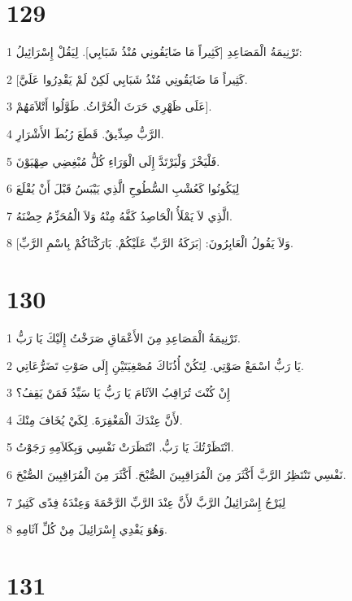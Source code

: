 \chapter{129}

\par 1 تَرْنِيمَةُ الْمَصَاعِدِ [كَثِيراً مَا ضَايَقُونِي مُنْذُ شَبَابِي]. لِيَقُلْ إِسْرَائِيلُ:
\par 2 [كَثِيراً مَا ضَايَقُونِي مُنْذُ شَبَابِي لَكِنْ لَمْ يَقْدِرُوا عَلَيَّ.
\par 3 عَلَى ظَهْرِي حَرَثَ الْحُرَّاثُ. طَوَّلُوا أَتْلاَمَهُمْ].
\par 4 الرَّبُّ صِدِّيقٌ. قَطَعَ رُبُطَ الأَشْرَارِ.
\par 5 فَلْيَخْزَ وَلْيَرْتَدَّ إِلَى الْوَرَاءِ كُلُّ مُبْغِضِي صِهْيَوْنَ.
\par 6 لِيَكُونُوا كَعُشْبِ السُّطُوحِ الَّذِي يَيْبَسُ قَبْلَ أَنْ يُقْلَعَ
\par 7 الَّذِي لاَ يَمْلَأُ الْحَاصِدُ كَفَّهُ مِنْهُ وَلاَ الْمُحَزِّمُ حِضْنَهُ.
\par 8 وَلاَ يَقُولُ الْعَابِرُونَ: [بَرَكَةُ الرَّبِّ عَلَيْكُمْ. بَارَكْنَاكُمْ بِاسْمِ الرَّبِّ].

\chapter{130}

\par 1 تَرْنِيمَةُ الْمَصَاعِدِ مِنَ الأَعْمَاقِ صَرَخْتُ إِلَيْكَ يَا رَبُّ.
\par 2 يَا رَبُّ اسْمَعْ صَوْتِي. لِتَكُنْ أُذُنَاكَ مُصْغِيَتَيْنِ إِلَى صَوْتِ تَضَرُّعَاتِي.
\par 3 إِنْ كُنْتَ تُرَاقِبُ الآثَامَ يَا رَبُّ يَا سَيِّدُ فَمَنْ يَقِفُ؟
\par 4 لأَنَّ عِنْدَكَ الْمَغْفِرَةَ. لِكَيْ يُخَافَ مِنْكَ.
\par 5 انْتَظَرْتُكَ يَا رَبُّ. انْتَظَرَتْ نَفْسِي وَبِكَلاَمِهِ رَجَوْتُ.
\par 6 نَفْسِي تَنْتَظِرُ الرَّبَّ أَكْثَرَ مِنَ الْمُرَاقِبِينَ الصُّبْحَ. أَكْثَرَ مِنَ الْمُرَاقِبِينَ الصُّبْحَ.
\par 7 لِيَرْجُ إِسْرَائِيلُ الرَّبَّ لأَنَّ عِنْدَ الرَّبِّ الرَّحْمَةَ وَعِنْدَهُ فِدًى كَثِيرٌ
\par 8 وَهُوَ يَفْدِي إِسْرَائِيلَ مِنْ كُلِّ آثَامِهِ.

\chapter{131}

